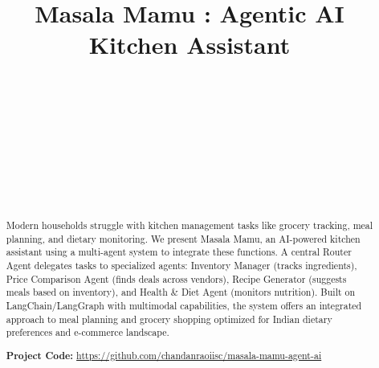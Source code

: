 \documentclass{ecai}
\begin{document}

\begin{frontmatter}




\title{Masala Mamu : Agentic AI Kitchen Assistant}

\author[A,B]{~}
\author[A,B]{~}
\author[A,B]{~}
\author[A,B]{~}
\author[A,B]{~}
\address[A]{Division of Interdisciplinary Sciences}
\address[B]{Indian Institute of Science, Bangalore}

\begin{abstract}
Modern households struggle with kitchen management tasks like grocery tracking, meal planning, and dietary monitoring. We present Masala Mamu, an AI-powered kitchen assistant using a multi-agent system to integrate these functions. A central Router Agent delegates tasks to specialized agents: Inventory Manager (tracks ingredients), Price Comparison Agent (finds deals across vendors), Recipe Generator (suggests meals based on inventory), and Health \& Diet Agent (monitors nutrition). Built on LangChain/LangGraph with multimodal capabilities, the system offers an integrated approach to meal planning and grocery shopping optimized for Indian dietary preferences and e-commerce landscape.

\smallskip
\noindent\small{\textbf{Project Code:} \url{https://github.com/chandanraoiisc/masala-mamu-agent-ai}}
\end{abstract}

\end{frontmatter}
\end{document}
